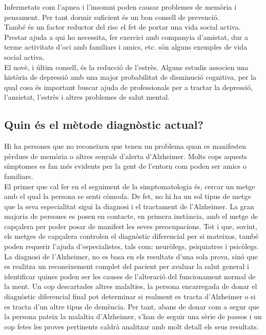 \documentclass[a4paper,12pt]{article}
\begin{document}
Infermetats com l'apnea i l'insomni poden causar problemes de memòria i pensament. Per tant dormir suficient és un bon consell de prevenció.\\
També és un factor reductor del risc el fet de portar una vida social activa. Prestar ajuda a qui ho necessita, fer exercici amb companyia d'amistat, dur a terme activitats d'oci amb familiars i amics, etc. són alguns exemples de vida social activa.\\
El novè, i últim consell, és la reducció de l'estrès. Alguns estudis associen una història de depressió amb una major probabilitat de disminució cognitiva, per la qual cosa és important buscar ajuda de professionals per a tractar la depressió, l'ansietat, l'estrès i altres problemes de salut mental.
\subsection*{Quin és el mètode diagnòstic actual?}
Hi ha persones que no reconeixen que tenen un problema quan es manifesten pèrdues de memòria o altres senyals d'alerta d'Alzheimer. Molts cops aquests símptomes es fan més evidents per la gent de l'entorn com poden ser amics o familiars.\\
El primer que cal fer en el seguiment de la simptomatologia és, cercar un metge amb el qual la persona se senti còmoda. De fet, no hi ha un sol tipus de metge que la seva especialitat sigui la diagnosi i el tractament de l'Alzheimer. La gran majoria de persones es posen en contacte, en primera instància, amb el metge de capçalera per poder posar de manifest les seves preocupacions. Tot i que, sovint, els metges de capçalera controlen el diagnòstic diferencial per si mateixos, també poden requerir l'ajuda d'especialistes, tals com: neuròlegs, psiquiatres i psicòlegs.\\
La diagnosi de l'Alzheimer, no es basa en els resultats d'una sola prova, sinó que es realitza un reconeixement complet del pacient per avaluar la salut general i identificar quines poden ser les causes de l'alteració del funcionament normal de la ment. Un cop descartades altres malalties, la persona encarregada de donar el diagnòstic diferencial final pot determinar si realment es tracta d'Alzheimer o si es tracta d'un altre tipus de demència. Per tant, abans de donar com a segur que la persona pateix la malaltia d'Alzheimer, s'han de seguir una sèrie de passos i un cop fetes les proves pertinents caldrà analitzar amb molt detall els seus resultats.\\
\end{document}

